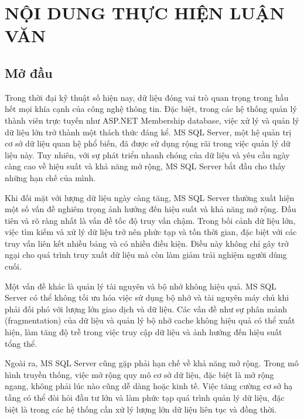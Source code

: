 \documentclass{article}[14pt]
\begin{document}
{\tableofcontents %


















    
\section{NỘI DUNG THỰC HIỆN LUẬN VĂN}
    {
    
\subsection{Mở đầu}
Trong thời đại kỹ thuật số hiện nay, dữ liệu đóng vai trò quan trọng trong hầu hết mọi khía cạnh của công nghệ thông tin. Đặc biệt, trong các hệ thống quản lý thành viên trực tuyến như ASP.NET Membership database, việc xử lý và quản lý dữ liệu lớn trở thành một thách thức đáng kể. MS SQL Server, một hệ quản trị cơ sở dữ liệu quan hệ phổ biến, đã được sử dụng rộng rãi trong việc quản lý dữ liệu này. Tuy nhiên, với sự phát triển nhanh chóng của dữ liệu và yêu cầu ngày càng cao về hiệu suất và khả năng mở rộng, MS SQL Server bắt đầu cho thấy những hạn chế của mình.

Khi đối mặt với lượng dữ liệu ngày càng tăng, MS SQL Server thường xuất hiện một số vấn đề nghiêm trọng ảnh hưởng đến hiệu suất và khả năng mở rộng. Đầu tiên và rõ ràng nhất là vấn đề tốc độ truy vấn chậm. Trong bối cảnh dữ liệu lớn, việc tìm kiếm và xử lý dữ liệu trở nên phức tạp và tốn thời gian, đặc biệt với các truy vấn liên kết nhiều bảng và có nhiều điều kiện. Điều này không chỉ gây trở ngại cho quá trình truy xuất dữ liệu mà còn làm giảm trải nghiệm người dùng cuối.

Một vấn đề khác là quản lý tài nguyên và bộ nhớ không hiệu quả. MS SQL Server có thể không tối ưu hóa việc sử dụng bộ nhớ và tài nguyên máy chủ khi phải đối phó với lượng lớn giao dịch và dữ liệu. Các vấn đề như sự phân mảnh (fragmentation) của dữ liệu và quản lý bộ nhớ cache không hiệu quả có thể xuất hiện, làm tăng độ trễ trong việc truy cập dữ liệu và ảnh hưởng đến hiệu suất tổng thể.

Ngoài ra, MS SQL Server cũng gặp phải hạn chế về khả năng mở rộng. Trong mô hình truyền thống, việc mở rộng quy mô cơ sở dữ liệu, đặc biệt là mở rộng ngang, không phải lúc nào cũng dễ dàng hoặc kinh tế. Việc tăng cường cơ sở hạ tầng có thể đòi hỏi đầu tư lớn và làm phức tạp quá trình quản lý dữ liệu, đặc biệt là trong các hệ thống cần xử lý lượng lớn dữ liệu liên tục và đồng thời.

}}
\end{document}
